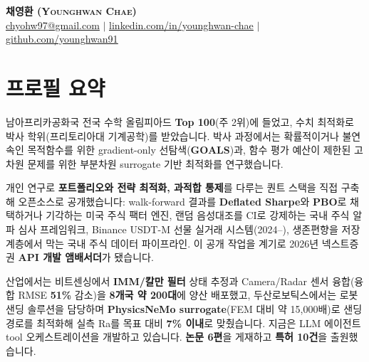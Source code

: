 \documentclass[a4paper,11pt]{article}
\begin{document}
\begin{center}
    \textbf{\Huge \scshape 채영환 (Younghwan Chae)} \\ \vspace{3pt}
    \small
    \href{mailto:chyohw97@gmail.com}{\underline{chyohw97@gmail.com}} \quad$|$\quad
    \href{https://www.linkedin.com/in/younghwan-chae/}{\underline{linkedin.com/in/younghwan-chae}} \quad$|$\quad
    \href{https://github.com/younghwan91}{\underline{github.com/younghwan91}}
\end{center}

\section{프로필 요약}
\small{
남아프리카공화국 전국 수학 올림피아드 \textbf{Top 100}(주 2위)에 들었고, 수치 최적화로 박사 학위(프리토리아대 기계공학)를 받았습니다. 박사 과정에서는 확률적이거나 불연속인 목적함수를 위한 gradient-only 선탐색(\textbf{GOALS})과, 함수 평가 예산이 제한된 고차원 문제를 위한 부분차원 surrogate 기반 최적화를 연구했습니다.

\vspace{2pt}\noindent 개인 연구로 \textbf{포트폴리오와 전략 최적화, 과적합 통제}를 다루는 퀀트 스택을 직접 구축해 오픈소스로 공개했습니다: walk-forward 결과를 \textbf{Deflated Sharpe}와 \textbf{PBO}로 채택하거나 기각하는 미국 주식 팩터 엔진, 랜덤 음성대조를 CI로 강제하는 국내 주식 알파 심사 프레임워크, Binance USDT-M 선물 실거래 시스템(2024--), 생존편향을 저장 계층에서 막는 국내 주식 데이터 파이프라인. 이 공개 작업을 계기로 2026년 넥스트증권 \textbf{API 개발 앰배서더}가 됐습니다.

\vspace{2pt}\noindent 산업에서는 비트센싱에서 \textbf{IMM/칼만 필터} 상태 추정과 Camera/Radar 센서 융합(융합 RMSE \textbf{51\%} 감소)을 \textbf{8개국 약 200대}에 양산 배포했고, 두산로보틱스에서는 로봇 샌딩 솔루션을 담당하며 \textbf{PhysicsNeMo surrogate}(FEM 대비 약 15,000배)로 샌딩 경로를 최적화해 실측 Ra를 목표 대비 \textbf{7\% 이내}로 맞췄습니다. 지금은 LLM 에이전트 tool 오케스트레이션을 개발하고 있습니다. \textbf{논문 6편}을 게재하고 \textbf{특허 10건}을 출원했습니다.
}

\end{document}
